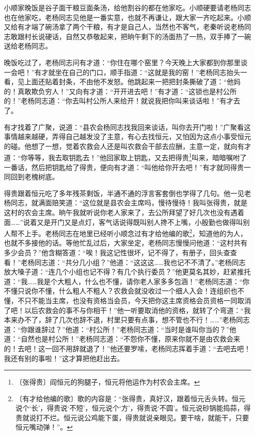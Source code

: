 \documentclass[12pt,UTF-8,openany]{ctexbook}
\begin{document}
\begin{large}
    小顺家晚饭是谷子面干粮豆面条汤，给他割谷的都在他家吃。小顺硬要请老杨同志也在他家吃，老杨同志见他是一番实意，也就不再谦让，跟大家一齐吃起来。小顺又给有才端了碗汤拿了两个干粮，有才是自己人，当然也不客气，老秦听说老杨同志敢跟村长说硬话，自然又恭敬起来，把晌午剩下的汤面热了一热，双手捧了一碗送给老杨同志。
    
    晚饭吃过了，老杨同志问有才道：“你住在哪个窑里？今天晚上大家都到你那里谈一会吧！”有才就坐在自己的门口，顺手指道：“这就是我的窑！”老杨同志抬头一看，见上面还贴着封条，不由他不发怒。他跳起来一把把封条撕破了道：“他妈的！真敢欺负穷人！”又向有才道：“开开进去吧！”有才道：“这锁也是村公所的！”老杨同志道：“你去叫村公所人来给开！就说我把你叫来谈话啦！”有才去了。
    
    有才找着了广聚，说道：“县农会杨同志找我回来谈话，叫你去开门啦！”广聚看这事情越来越硬，弄得自己越发没了主意，有心去找恒元，又怕因为这点小事受恒元的碰。他想了一想，觉着农救会人还是叫农救会干部去应酬，主意一定，就向有才道：“你等等，我去取钥匙去！”他回家取上钥匙，又去把得贵\footnote{〔张得贵〕阎恒元的狗腿子，恒元将他运作为村农会主席。}叫来，暗暗嘱咐了一番话，然后把钥匙给了得贵，便向有才道：“叫他给你开去吧！”有才就同得贵一同回到老槐树底。
    
    得贵跟着恒元吃了多年残茶剩饭，半通不通的浮言客套倒也学得了几句。他一见老杨同志，就满面赔笑道：“这位就是县农会主席吗，慢待慢待！我叫张得贵，就是这村的农会主席。晌午我就听说你老人家来了，去公所拜望了好几次也没有遇着面……”说着又是开门又是点灯，客气话说得既叫别人搀不上嘴，小殷勤也做得叫别人帮不上手。老杨同志在地里已经听小顺念过有才给他编的歌\footnote{〔有才给他编的歌〕歌的内容是：“张得贵，真好汉，跟着恒元舌头转。恒元说个‘长’，得贵说‘不短’，恒元说个‘方’，得贵说‘不圆’。恒元说砂锅能捣蒜，得贵就说打不烂。恒元说公鸡能下蛋，得贵就说亲眼见。要干啥，就能干，只要恒元嘴动弹！”。}，知道他的为人，也就不多接他的话。等他忙乱过后，大家坐定，老杨同志慢慢问他道：“这村共有多少会员？”他含糊答道：“唉！我这记性很坏，记不得了，有册子，回头查查看！”老杨同志道：“共分几小组？”他道：“这这这……我也记不不清了。”老杨同志放大嗓子道：“连几个小组也记不得？有几个执行委员？”他更莫名其妙，赶紧推托道：“我……我是个大粗人，什么也不懂，请你老人家多多包涵！”老杨同志道：“你不懂只说你不懂，什么粗人不粗人？农救会就没收过一个细人入会！连组织也不懂，不只不能当主席，也没有资格当会员，今天把你这主席资格会员资格一同取消了吧！以后农救会的事不与你相干！”他一听要取消他的资格，就转了个弯道：“我本来办不了，辞了几次也辞不退，村里只要有点事，想不管也不行！……”老杨同志道：“你跟谁辞过？”他道：“村公所！”老杨同志道：“当时是谁叫你当的？”他道：“自然也是村公所！”老杨同志道：“不怨你不懂，原来你就不是由农救会来的！去吧！这一回不用辞就退了！”他还要罗嗦，老杨同志挥着手道：“去吧去吧！我还有别的事啦！”这才算把他赶出去。
    

\end{large}
\end{document}
